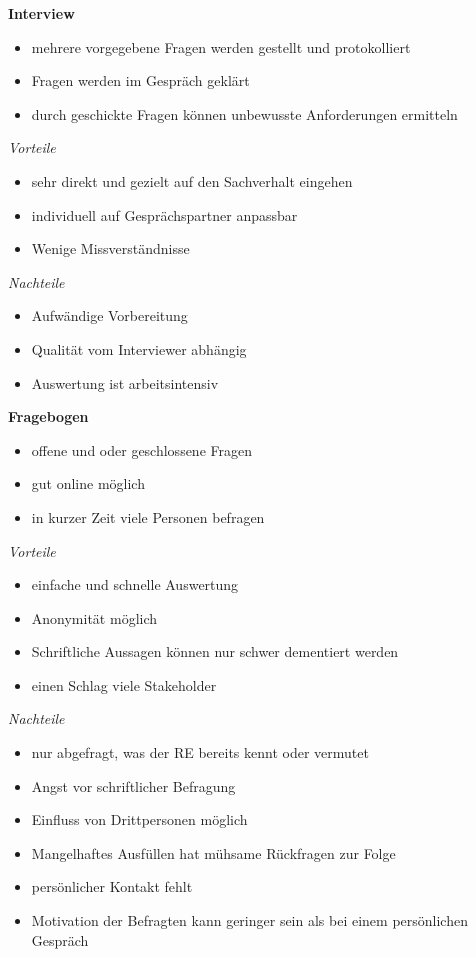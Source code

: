\documentclass{report}
\theoremstyle{definition}
\theoremstyle{example}
\begin{document}
\textbf{Interview}
\begin{itemize}
   \item mehrere vorgegebene Fragen werden gestellt und protokolliert
   \item Fragen werden im Gespräch geklärt
   \item durch geschickte Fragen können unbewusste Anforderungen ermitteln
\end{itemize}
\textit{Vorteile}
\begin{itemize}
   \item sehr direkt und gezielt auf den Sachverhalt eingehen
   \item individuell auf Gesprächspartner anpassbar
   \item Wenige Missverständnisse
\end{itemize}
\textit{Nachteile}
\begin{itemize}
   \item Aufwändige Vorbereitung
   \item Qualität vom Interviewer abhängig
   \item Auswertung ist arbeitsintensiv
\end{itemize}

\textbf{Fragebogen}
\begin{itemize}
   \item offene und oder geschlossene Fragen
   \item gut online möglich
   \item in kurzer Zeit viele Personen befragen
\end{itemize}
\textit{Vorteile}
\begin{itemize}
   \item einfache und schnelle Auswertung
   \item Anonymität möglich
   \item Schriftliche Aussagen können nur schwer dementiert werden
   \item einen Schlag viele Stakeholder 
\end{itemize}
\textit{Nachteile}
\begin{itemize}
   \item nur abgefragt, was der RE bereits kennt oder vermutet
   \item Angst vor schriftlicher Befragung
   \item Einfluss von Drittpersonen möglich
   \item Mangelhaftes Ausfüllen hat mühsame Rückfragen zur Folge
   \item persönlicher Kontakt fehlt
   \item Motivation der Befragten kann geringer sein als bei einem persönlichen Gespräch
\end{itemize}
\end{document}
